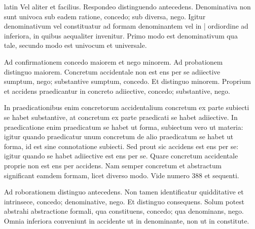 \begin{otherlanguage*}{latin}
\pstart
Vel aliter et facilius. Respondeo distinguendo antecedens. Denominativa non sunt univoca sub eadem ratione, concedo; sub diversa, nego. Igitur denominativum vel constituatur ad formam denominantem vel in \textnormal{|} ordiordine ad inferiora, in quibus aequaliter invenitur. Primo modo est denominativum qua tale, secundo modo est univocum et universale. 
\pend

\pstart
Ad confirmationem concedo maiorem et nego minorem. Ad probationem distinguo maiorem. Concretum accidentale non est ens per se adiiective sumptum, nego; substantive sumptum, concedo. Et distinguo minorem. Proprium et accidens praedicantur in concreto adiiective, concedo; substantive, nego. 
\pend

\pstart
In praedicationibus enim concretorum accidentalium concretum ex parte subiecti se habet substantive, at concretum ex parte praedicati se habet adiiective. In praedicatione enim praedicatum se habet ut forma, subiectum vero ut materia:
igitur quando praedicatur unum concretum de alio praedicatum se habet ut forma, id est sine connotatione subiecti. Sed prout sic accidens est ens per se:
igitur quando se habet adiiective est ens per se. Quare concretum accidentale proprie non est ens per accidens. Nam semper concretum et abstractum significant eamdem formam, licet diverso modo. Vide numero 388 et sequenti. 
\pend

\pstart
Ad roborationem distinguo antecedens. Non tamen identificatur quidditative et intrinsece, concedo; denominative, nego. Et distinguo consequens. Solum potest abstrahi abstractione formali, qua constituens, concedo; qua denominans, nego. Omnia inferiora conveniunt in accidente ut in denominante, non ut in constitute. 
\pend

\pstart
{}
\pend


\end{otherlanguage*}
